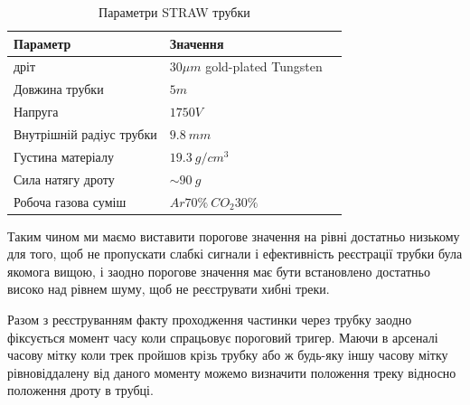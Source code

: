 \documentclass[pdftex,14pt]{scrartcl}
\begin{document}
	
	\begin{table}[h]
	\centering
	\caption[Table caption text]{Параметри STRAW трубки}
	\begin{tabular}{|l|l|p{8cm}|}
		\hline
		Параметр & Значення \\
		\hline
		дріт & $30\mu m$ gold-plated Tungsten \\
		\hline
		Довжина трубки & $5m$ \\
		\hline
		Напруга & $1750 V$ \\
		\hline
		Внутрішній радіус трубки & $9.8~mm$ \\
		\hline
		Густина матеріалу & $19.3 ~g/cm^3$ \\
		\hline
		Сила натягу дроту & $\sim 90~g$ \\
		\hline
		Робоча газова суміш & $Ar70\% ~CO_2 30\%$ \\
		\hline
	\end{tabular}
	
	\label{table:straw_par}
	\end{table}
	
	Таким чином ми маємо виставити порогове значення на рівні достатньо низькому для того, щоб не пропускати слабкі сигнали і ефективність реєстрації трубки була якомога вищою, і заодно порогове значення має бути встановлено достатньо високо над рівнем шуму, щоб не реєструвати хибні треки.
	

	Разом з реєструванням факту проходження частинки через трубку заодно фіксується момент часу коли спрацьовує пороговий тригер. Маючи в арсеналі часову мітку коли трек пройшов крізь трубку або ж будь-яку іншу часову мітку рівновіддалену від даного моменту можемо визначити положення треку відносно положення дроту в трубці.
	
		
	
\end{document}
